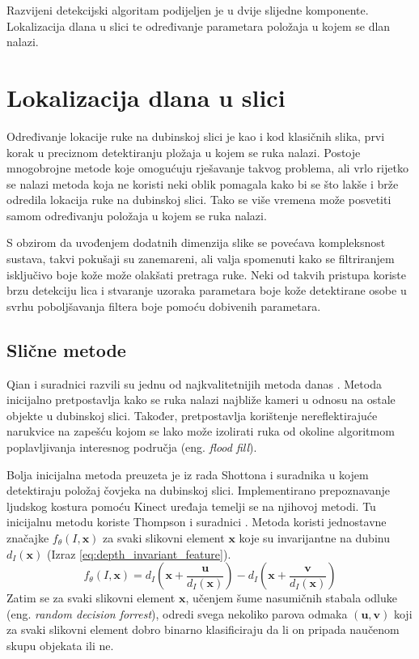 \documentclass[times, utf8, diplomski, numeric]{fer}
\begin{document}
Razvijeni detekcijski algoritam podijeljen je u dvije slijedne komponente. Lokalizacija dlana u slici te određivanje parametara položaja u kojem se dlan nalazi.

\section{Lokalizacija dlana u slici}
Određivanje lokacije ruke na dubinskoj slici je kao i kod klasičnih slika, prvi korak u preciznom detektiranju pložaja u kojem se ruka nalazi. Postoje mnogobrojne metode koje omogućuju rješavanje takvog problema, ali vrlo rijetko se nalazi metoda koja ne koristi neki oblik pomagala kako bi se što lakše i brže odredila lokacija ruke na dubinskoj slici. Tako se više vremena može posvetiti samom određivanju položaja u kojem se ruka nalazi.

S obzirom da uvođenjem dodatnih dimenzija slike se povećava kompleksnost sustava, takvi pokušaji su zanemareni, ali valja spomenuti kako se filtriranjem isključivo boje kože može olakšati pretraga ruke. Neki od takvih pristupa koriste brzu detekciju lica i stvaranje uzoraka parametara boje kože detektirane osobe u svrhu poboljšavanja filtera boje pomoću dobivenih parametara.

\subsection{Slične metode}
Qian i suradnici razvili su jednu od najkvalitetnijih metoda danas \cite{qian2014realtime}. Metoda inicijalno pretpostavlja kako se ruka nalazi najbliže kameri u odnosu na ostale objekte u dubinskoj slici. Također, pretpostavlja korištenje nereflektirajuće narukvice na zapešću kojom se lako može izolirati ruka od okoline algoritmom poplavljivanja interesnog područja (eng. \textit{flood fill}).

Bolja inicijalna metoda preuzeta je iz rada Shottona i suradnika \cite{shotton2013real} u kojem detektiraju položaj čovjeka na dubinskoj slici. Implementirano prepoznavanje ljudskog kostura pomoću Kinect uređaja temelji se na njihovoj metodi. Tu inicijalnu metodu koriste Thompson i suradnici \cite{tompson2014real}. Metoda koristi jednostavne značajke $f_{\theta}(I,\mathbf{x})$ za svaki slikovni element $\mathbf{x}$ koje su invarijantne na dubinu $d_{I}(\mathbf{x}) $ (Izraz \ref{eq:depth_invariant_feature}).
\begin{equation}\label{eq:depth_invariant_feature}
f_{\theta}(I,\mathbf{x})=d_{I}(\mathbf{x}+ \frac{\mathbf{u}}{d_{I}(\mathbf{x})})-d_{I}(\mathbf{x}+ \frac{\mathbf{v}}{d_{I}(\mathbf{x})})\end{equation}
Zatim se za svaki slikovni element $\mathbf{x}$, učenjem šume nasumičnih stabala odluke (eng. \textit{random decision forrest}), odredi svega nekoliko parova odmaka $(\mathbf{u},\mathbf{v})$ koji za svaki slikovni element dobro binarno klasificiraju da li on pripada naučenom skupu objekata ili ne.
\end{document}
